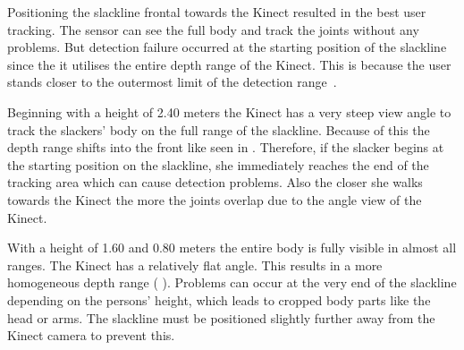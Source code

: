 Positioning the slackline frontal towards the Kinect resulted in the best user tracking.
The sensor can see the full body and track the joints without any problems.
But detection failure occurred at the starting position of the slackline since the it utilises the entire depth range of the Kinect. This is because the user stands closer to the outermost limit of the detection range~\textbf{}.


Beginning with a height of 2.40 meters the Kinect has a very steep view angle to track the slackers' body on the full range of the slackline. Because of this the depth range shifts into the front like seen in \textbf{}. Therefore, if the slacker begins at the starting position on the slackline, she immediately reaches the end of the tracking area which can cause detection problems. Also the closer she walks towards the Kinect the more the joints overlap due to the angle view of the Kinect.

With a height of 1.60 and 0.80 meters the entire body is fully visible in almost all ranges. The Kinect has a relatively flat angle. This results in a more homogeneous depth range ( \textbf{}). Problems can occur at the very end of the slackline depending on the persons' height, which leads to cropped body parts like the head or arms. The slackline must be positioned slightly further away from the Kinect camera to prevent this.

